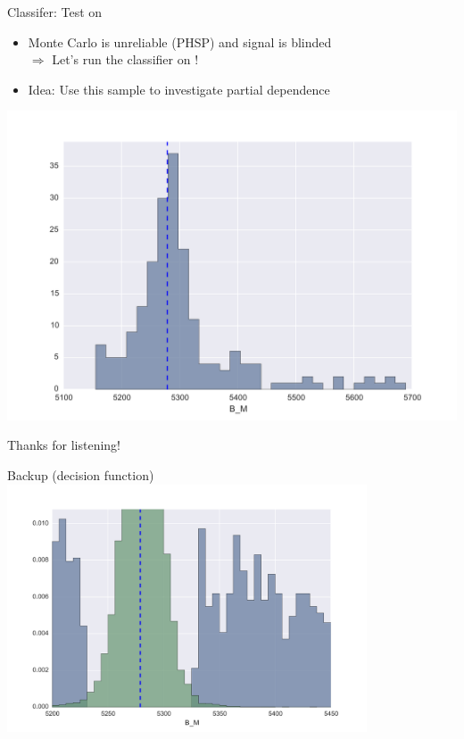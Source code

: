 \documentclass[compress,aspectratio=1610]{beamer}
\begin{document}
\begin{frame}{Classifer: Test on \HepProcess{\PB\to\PKstar\Pmu\Pmu}}
  \begin{minipage}{0.35\textwidth}
    \begin{itemize}
      \item Monte Carlo is unreliable (PHSP) and signal is blinded \\
        \vspace{1em}
        $\Rightarrow$ Let's run the classifier on \HepProcess{\PB\to\PKstar\Pmu\Pmu}!
      \item Idea: Use this sample to investigate partial dependence
    \end{itemize}
  \end{minipage}
  \begin{minipage}{0.64\textwidth}
    \centering
    \includegraphics[page=1,width=\textwidth]{./figures/plots_kst.pdf}
  \end{minipage}
\end{frame}

\begin{frame}
  \begin{center}
    \Huge Thanks for listening!
  \end{center}
\end{frame}

\appendix

\begin{frame}{Backup (\PKstar decision function)}
  \centering
  \includegraphics[page=69,width=0.8\textwidth]{./figures/final.pdf}
\end{frame}
\end{document}
